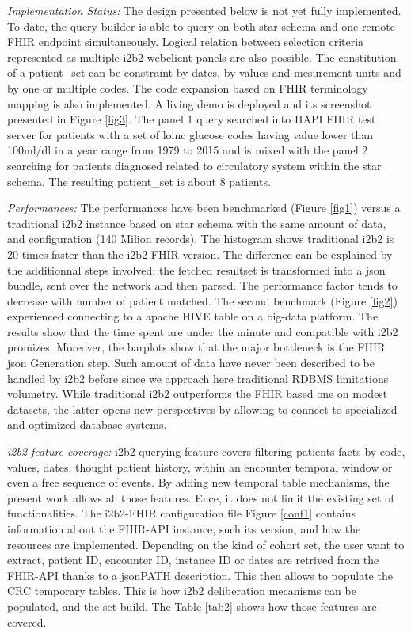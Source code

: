 \documentclass{amia}
\newcommand{\remPierre}[1]{\todo[color=green]{[PZ]{\scriptsize #1\par}}}
\begin{document}
\textit{Implementation Status: } The design presented below is not yet fully implemented\remPierre{Dire plutôt is implemented at XX\%}. To date, the query builder is able to query on both star schema and one remote FHIR endpoint simultaneously. Logical relation between selection criteria represented as multiple i2b2 webclient panels are also possible. The constitution of a patient\_set can be constraint by dates, by values and mesurement units and by one or multiple codes. The code expansion based on FHIR terminology mapping is also implemented. A living demo is deployed\cite{ref16}  and its screenshot presented in Figure \ref{fig3}. The panel 1 query searched into HAPI FHIR test server for patients with a set of loinc glucose codes having value lower than 100ml/dl in a year range from 1979 to 2015 and is mixed with the panel 2 searching for patients diagnosed related to circulatory system within the star schema. The resulting patient\_set is about 8 patients.

\textit{Performances: } The performances have been benchmarked (Figure \ref{fig1}) versus a traditional i2b2 instance based on star schema with the same amount of data, and configuration (140 Milion records). The histogram shows traditional i2b2 is 20 times faster than the i2b2-FHIR version. The difference can be explained by the additionnal steps involved: the fetched resultset is transformed into a json bundle, sent over the network and then parsed. The performance factor tends to decrease with number of patient matched. The second benchmark (Figure \ref{fig2}) experienced connecting to a apache HIVE table on a big-data platform. The results show that the time spent are under the minute and compatible with i2b2 promizes. Moreover, the barplots show that the major bottleneck is the FHIR json Generation step. Such amount of data have never been described to be handled by i2b2 before since we approach here traditional RDBMS limitations volumetry. While traditional i2b2 outperforms the FHIR based one on modest datasets, the latter opens new perspectives by allowing to connect to specialized and optimized database systems.


\textit{i2b2 feature coverage: }i2b2 querying feature covers filtering patients facts by code, values, dates, thought patient history, within an encounter temporal window or even a free sequence of events. By adding new temporal table mechanisms, the present work allows all those features. Ence, it does not limit the existing set of functionalities. The i2b2-FHIR configuration file Figure \ref{conf1} contains information about the FHIR-API instance, such its version, and how the resources are implemented. Depending on the kind of cohort set, the user want to extract, patient ID, encounter ID, instance ID or dates are retrived from the FHIR-API thanks to a jsonPATH description. This then allows to populate the CRC temporary tables. This is how i2b2 deliberation mecanisms can be populated, and the set build. The Table \ref{tab2} shows how those features are covered.
\end{document}

